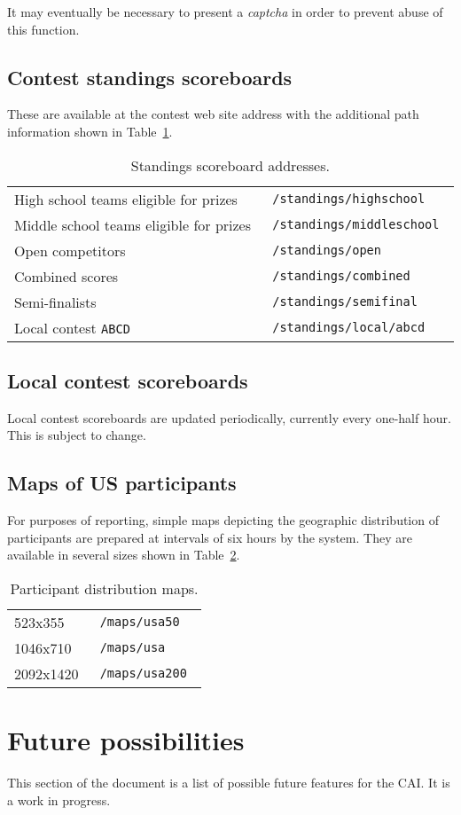 \documentclass[11pt,letterpaper]{refart}
\newenvironment{fulltable}[1][tbp]
 {\begin{table}[#1]%
  \hspace*{-\leftmarginwidth}%
  \begin{minipage}{\fullwidth}}
 {\end{minipage}\end{table}}
\begin{document}
It may eventually be necessary to present a \emph{captcha} in order to
prevent abuse of this function.

\subsection{Contest standings scoreboards}
These are available at the contest web site address with the
additional path information shown in Table~\ref{tbl:scoreboards}.\
\begin{fulltable}
\centering
\caption{Standings scoreboard addresses.}
\begin{tabular}{l>{\tt}l}
High school teams eligible for prizes & /standings/highschool \\
Middle school teams eligible for prizes & /standings/middleschool \\
Open competitors & /standings/open \\
Combined scores & /standings/combined \\
Semi-finalists & /standings/semifinal \\
Local contest \texttt{ABCD} & /standings/local/abcd
\end{tabular}
\label{tbl:scoreboards}
\end{fulltable}

\subsection{Local contest scoreboards}
Local contest scoreboards are updated periodically, currently every
one-half hour. This is subject to change.

\subsection{Maps of US participants}
For purposes of reporting, simple maps depicting the geographic
distribution of participants are prepared at intervals of six hours by
the system. They are available in several sizes shown in
Table~\ref{tbl:maps}.\
\begin{table}
\centering
\caption{Participant distribution maps.}
\begin{tabular}{l>{\tt}l}
523x355 & /maps/usa50  \\
1046x710 & /maps/usa \\
 2092x1420 & /maps/usa200 
\end{tabular}
\label{tbl:maps}
\end{table}

\section{Future possibilities}
This section of the document is a list of possible future features for
the CAI. It is a work in progress.
\end{document}
